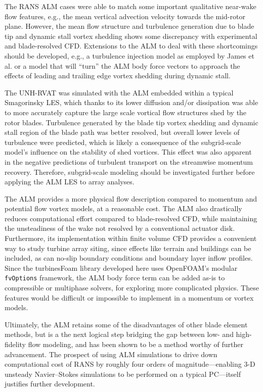 \documentclass[times]{weauth}
\begin{document}
The RANS ALM cases were able to match some important qualitative near-wake flow
features, e.g., the mean vertical advection velocity towards the mid-rotor
plane. However, the mean flow structure and turbulence generation due to blade
tip and dynamic stall vortex shedding shows some discrepancy with experimental
and blade-resolved CFD. Extensions to the ALM to deal with these shortcomings
should be developed, e.g., a turbulence injection model as employed by James et
al. \cite{James2010} or a model that will ``turn'' the ALM body force vectors to
approach the effects of leading and trailing edge vortex shedding during dynamic
stall.

The UNH-RVAT was simulated with the ALM embedded within a typical Smagorinsky
LES, which thanks to its lower diffusion and/or dissipation was able to more
accurately capture the large scale vortical flow structures shed by the rotor
blades. Turbulence generated by the blade tip vortex shedding and dynamic stall
region of the blade path was better resolved, but overall lower levels of
turbulence were predicted, which is likely a consequence of the subgrid-scale
model's influence on the stability of shed vortices. This effect was also
apparent in the negative predictions of turbulent transport on the streamwise
momentum recovery. Therefore, subgrid-scale modeling should be investigated
further before applying the ALM LES to array analyses.

The ALM provides a more physical flow description compared to momentum and
potential flow vortex models, at a reasonable cost. The ALM also drastically
reduces computational effort compared to blade-resolved CFD, while maintaining
the unsteadiness of the wake not resolved by a conventional actuator disk.
Furthermore, its implementation within finite volume CFD provides a convenient
way to study turbine array siting, since effects like terrain and buildings can
be included, as can no-slip boundary conditions and boundary layer inflow
profiles. Since the turbinesFoam library developed here uses OpenFOAM's modular
\texttt{fvOptions} framework, the ALM body force term can be added as-is to
compressible or multiphase solvers, for exploring more complicated physics.
These features would be difficult or impossible to implement in a momentum or
vortex models.

Ultimately, the ALM retains some of the disadvantages of other blade element
methods, but is a the next logical step bridging the gap between low- and
high-fidelity flow modeling, and has been shown to be a method worthy of further
advancement. The prospect of using ALM simulations to drive down computational
cost of RANS by roughly four orders of magnitude---enabling 3-D unsteady
Navier--Stokes simulations to be performed on a typical PC---itself justifies
further development.
\end{document}
